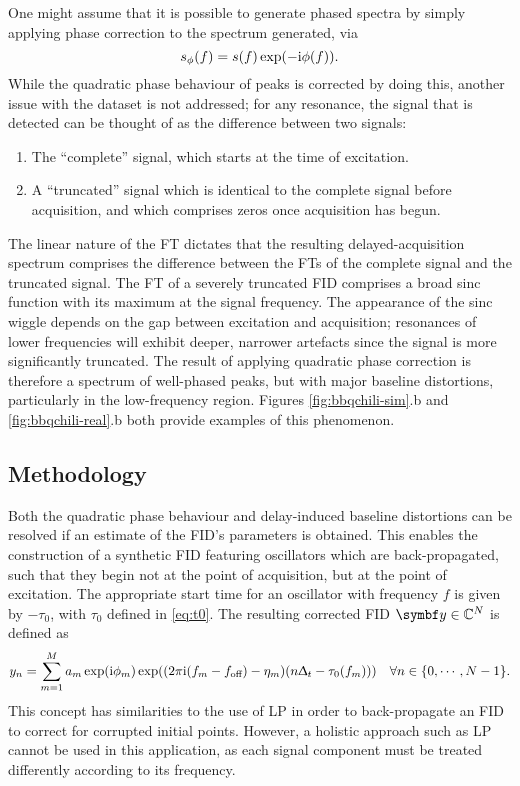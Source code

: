 One might assume that it is possible to generate phased spectra by simply
applying phase correction to the spectrum generated, via
\begin{equation}
    s_{\phi}(f) = s(f) \exp(-\mathrm{i} \phi(f)).
        \label{eq:spec-phase-chili}
\end{equation}
While the quadratic phase behaviour of peaks is corrected by doing this,
another issue with the dataset is not addressed;
for any resonance, the signal that is detected can be thought of as
the difference between two signals:
\begin{enumerate}
    \item The ``complete'' signal, which starts at the time of excitation.
    \item A ``truncated'' signal which is identical to the complete signal
        before acquisition, and which comprises zeros once acquisition has
        begun.
\end{enumerate}
The linear nature of the \ac{FT} dictates that the
resulting delayed-acquisition spectrum comprises the difference between the
\acp{FT} of the complete signal and the truncated signal.  The \ac{FT} of a
severely
truncated \ac{FID} comprises a broad sinc function with its maximum
at the signal frequency. The appearance of the sinc wiggle depends on
the gap between excitation and acquisition; resonances of lower
frequencies will exhibit deeper, narrower artefacts since the signal is more
significantly truncated. The result of applying quadratic phase correction is
therefore a spectrum of well-phased peaks, but with major baseline distortions,
particularly in the low-frequency region. Figures \ref{fig:bbqchili-sim}.b and
\ref{fig:bbqchili-real}.b both provide examples of this phenomenon.

\subsection{Methodology}
Both the quadratic phase behaviour and delay-induced baseline distortions can
be resolved if an estimate of the \ac{FID}'s parameters is obtained. This enables
the construction of a synthetic \ac{FID} featuring oscillators which are
back-propagated, such that they begin not at the point of acquisition, but at
the point of excitation. The appropriate start time for an oscillator with
frequency $f$ is given by $-\tau_0$, with $\tau_0$ defined in \cref{eq:t0}. The
resulting corrected \ac{FID} $\by \in \mathbb{C}^N$ is defined as
\begin{equation}
    y_n = \sum_{m=1}^{M} a_m \exp(\mathrm{i} \phi_m) \exp((2 \pi \mathrm{i} (f_m - f_{\text{off}}) - \eta_m) (n \Updelta_t - \tau_0(f_m)))\quad
        \forall n \in \lbrace 0, \cdots, N-1 \rbrace.
    \label{eq:backprop}
\end{equation}
This concept has similarities to the use of \ac{LP} in order to back-propagate
an \ac{FID} to correct for corrupted initial points. However, a holistic
approach such as \ac{LP} cannot be used in this application, as each signal
component must be treated differently according to its frequency.

